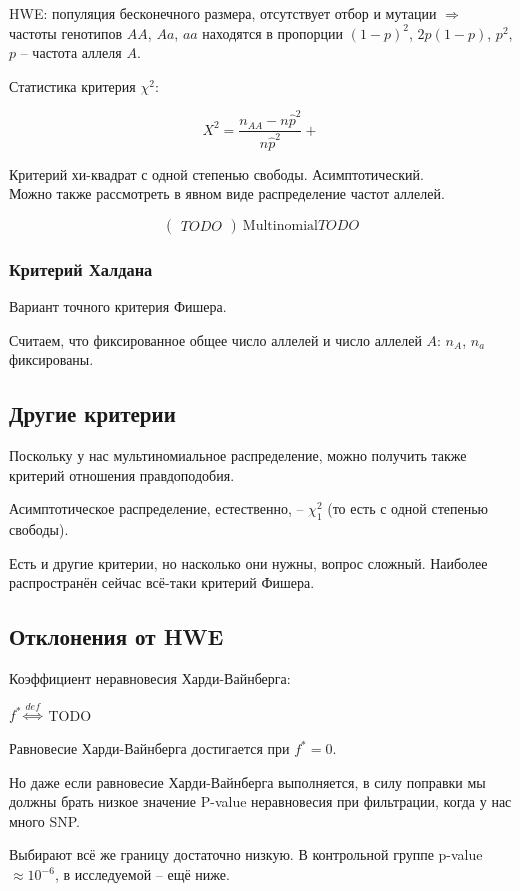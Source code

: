 \documentclass[main.tex]{subfiles}
\begin{document}
HWE: популяция бесконечного размера, отсутствует отбор и мутации $ \Rightarrow $ частоты генотипов $ AA $, $ Aa $, $ aa $ находятся в пропорции $ (1-p)^2 $, $ 2p(1-p) $, $ p^2 $, $ p $ -- частота аллеля $ A $.

Статистика критерия $\chi^2$:

\[ X^2 = \frac{n_{AA} - n \hat p^2 }{n \hat p^2} +  \]

Критерий хи-квадрат с одной степенью свободы.
Асимптотический. \\

Можно также рассмотреть в явном виде распределение частот аллелей.

\[ \begin{pmatrix}
	TODO
\end{pmatrix} ~ \text{Multinomial} TODO \]

\subsubsection{Критерий Халдана}

Вариант точного критерия Фишера.

Считаем, что фиксированное общее число аллелей и число аллелей $ A $: $ n_A $, $ n_a $ фиксированы.

\subsection{Другие критерии}

Поскольку у нас мультиномиальное распределение, можно получить также критерий отношения правдоподобия.

Асимптотическое распределение, естественно, -- $ \chi^2_1 $ (то есть с одной степенью свободы).

Есть и другие критерии, но насколько они нужны, вопрос сложный.
Наиболее распространён сейчас всё-таки критерий Фишера.

\subsection{Отклонения от HWE}

Коэффициент неравновесия Харди-Вайнберга:

$ f^* \overset{def}\Leftrightarrow $ TODO

Равновесие Харди-Вайнберга достигается при $ f^* = 0 $.

\begin{leftbar}
	Но даже если равновесие Харди-Вайнберга выполняется, в силу поправки мы должны брать низкое значение P-value неравновесия при фильтрации, когда у нас много SNP.
	
	Выбирают всё же границу достаточно низкую.
	В контрольной группе p-value $ \approx 10^{-6} $, в исследуемой -- ещё ниже.
\end{leftbar}
\end{document}

